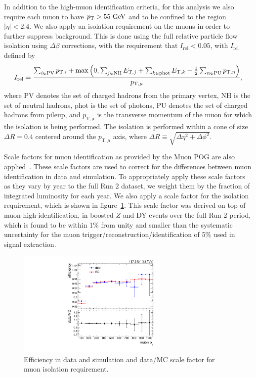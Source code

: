 In addition to the high-\pt muon identification criteria, for this analysis we also require each muon to have $\pt>55\unit{GeV}$ and to be confined to the region $|\eta|<2.4$.
We also apply an isolation requirement on the muons in order to further suppress background.
This is done using the full relative particle flow isolation using $\Delta\beta$ corrections, with the requirement that $I_\mathrm{rel}<0.05$, with $I_\mathrm{rel}$ defined by
\begin{equation}
  I_\mathrm{rel}=\frac{\sum_{i\in\mathrm{PV}}p_{\mathrm{T},i}+\max\pqty{0,\sum_{j\in\mathrm{NH}}E_{\mathrm{T},j}+\sum_{k\in\mathrm{phot}}E_{\mathrm{T},k}-\frac{1}{2}\sum_{n\in\mathrm{PU}}p_{\mathrm{T},n}}}{p_{\mathrm{T},\mu}},
\end{equation}
where $\mathrm{PV}$ denotes the set of charged hadrons from the primary vertex, $\mathrm{NH}$ is the set of neutral hadrons, $\mathrm{phot}$ is the set of photons, $\mathrm{PU}$ denotes the set of charged hadrons from pileup, and $p_\mathrm{T,\mu}$ is the transverse momentum of the muon for which the isolation is being performed.
The isolation is performed within a cone of size $\Delta R=0.4$ centered around the $p_{\mathrm{T},\mu}$ axis, where $\Delta R\equiv\sqrt{\Delta\eta^2+\Delta\phi^2}$.

Scale factors for muon identification as provided by the Muon POG are also applied~\cite{MuonPAGs}.
These scale factors are used to correct for the differences between muon identification in data and simulation.
To appropriately apply these scale factors as they vary by year to the full Run 2 dataset, we weight them by the fraction of integrated luminosity for each year.
We also apply a scale factor for the isolation requirement, which is shown in figure~\ref{fig:muonIsoSF}.
This scale factor was derived on top of muon high-\pt identification, in boosted $Z$ and DY events over the full Run 2 period, which is found to be within 1\% from unity and smaller than the systematic uncertainty for the muon trigger/reconstruction/identification of 5\% used in signal extraction.

\begin{figure}[htbp]
  \centering
  \includegraphics[width=0.65\textwidth]{fig/eventSelection/muonFullIsoSF.pdf}
  \caption{
    Efficiency in data and simulation and data/MC scale factor for muon isolation requirement.
  }
  \label{fig:muonIsoSF}
\end{figure}

